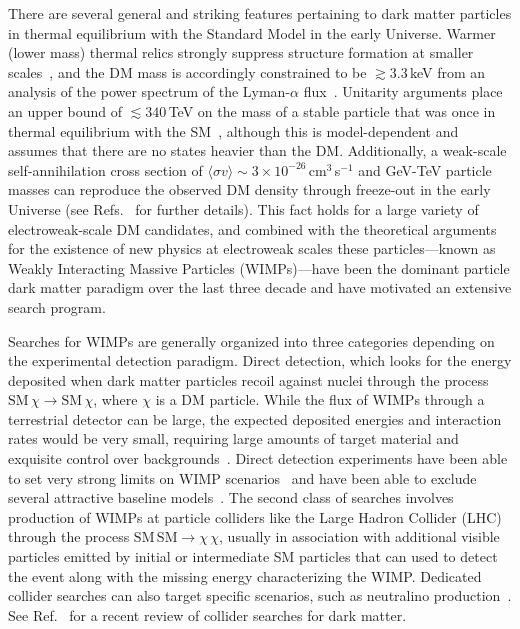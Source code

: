 There are several general and striking features pertaining to dark matter particles in thermal equilibrium with the Standard Model in the early Universe. Warmer (lower mass) thermal relics strongly suppress structure formation at smaller scales~\cite{Bringmann:2006mu}, and the DM mass is accordingly constrained to be $\gtrsim 3.3$\,keV from an analysis of the power spectrum of the Lyman-$\alpha$ flux~\cite{Viel:2013apy}. Unitarity arguments place an upper bound of $\lesssim340$\,TeV on the mass of a stable particle that was once in thermal equilibrium with the SM~\cite{Griest:1989wd}, although this is model-dependent and assumes that there are no states heavier than the DM. Additionally, a weak-scale self-annihilation cross section of $\langle\sigma v\rangle\sim 3\times10^{-26}$\,cm$^3$\,s$^{-1}$ and GeV-TeV particle masses can reproduce the observed DM density through freeze-out in the early Universe (see Refs.~\cite{1991NuPhB.360..145G,1996PhR...267..195J,Lisanti:2016jxe} for further details). This fact holds for a large variety of electroweak-scale DM candidates, and combined with the theoretical arguments for the existence of new physics at electroweak scales these particles---known as Weakly Interacting Massive Particles (WIMPs)---have been the dominant particle dark matter paradigm over the last three decade and have motivated an extensive search program. 

Searches for WIMPs are generally organized into three categories depending on the experimental detection paradigm. Direct detection, which looks for the energy deposited when dark matter particles recoil against nuclei through the process $\text{SM}\,\chi\rightarrow\text{SM}\,\chi$, where $\chi$ is a DM particle. While the flux of WIMPs through a terrestrial detector can be large, the expected deposited energies and interaction rates would be very small, requiring large amounts of target material and exquisite control over backgrounds~\cite{Lisanti:2016jxe}. Direct detection experiments have been able to set very strong limits on WIMP scenarios~\cite{Aprile:2018dbl,Agnes:2018ves} and have been able to exclude several attractive baseline models~\cite{Escudero:2016gzx}. The second class of searches involves production of WIMPs at particle colliders like the Large Hadron Collider (LHC) through the process $\mathrm{SM}\,\mathrm{SM}\rightarrow\chi\,\chi$, usually in association with additional visible particles emitted by initial or intermediate SM particles that can used to detect the event along with the missing energy characterizing the WIMP. Dedicated collider searches can also target specific scenarios, such as neutralino production~\cite{Patrignani:2016xqp}. See Ref.~\cite{Kahlhoefer:2017dnp} for a recent review of collider searches for dark matter.

